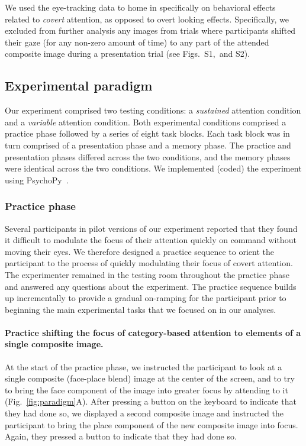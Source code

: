 \documentclass[english]{article}
\newcommand{\gazeLocations}{S1}
\newcommand{\excludedTrials}{S2}
\begin{document}
We used the eye-tracking data to home in specifically on behavioral effects
related to \textit{covert} attention, as opposed to overt looking effects.
Specifically, we excluded from further analysis any images from trials where
participants shifted their gaze (for any non-zero amount of time) to any part
of the attended composite image during a presentation trial
(see Figs.~\gazeLocations,~and \excludedTrials).

\subsection*{Experimental paradigm}

Our experiment comprised two testing conditions: a \textit{sustained} attention
condition and a \textit{variable} attention condition. Both experimental
conditions comprised a practice phase followed by a series of eight task
blocks. Each task block was in turn comprised of a presentation phase and a
memory phase. The practice and presentation phases differed across the two
conditions, and the memory phases were identical across the two conditions.
We implemented (coded) the experiment using PsychoPy~\citep{PeirEtal19}.

\subsubsection*{Practice phase}

Several participants in pilot versions of our experiment reported that they
found it difficult to modulate the focus of their attention quickly on command
without moving their eyes. We therefore designed a practice sequence to orient
the participant to the process of quickly modulating their focus of covert
attention. The experimenter remained in the testing room throughout the
practice phase and answered any questions about the experiment. The practice
sequence builds up incrementally to provide a gradual on-ramping for the
participant prior to beginning the main experimental tasks that we focused on
in our analyses.

\paragraph{Practice shifting the focus of category-based attention to elements
of a single composite image.}

At the start of the practice phase, we instructed the participant to look at a
single composite (face-place blend) image at the center of the screen, and to
try to bring the face component of the image into greater focus by attending to
it (Fig.~\ref{fig:paradigm}A). After pressing a button on the keyboard to
indicate that they had done so, we displayed a second composite image and
instructed the participant to bring the place component of the new composite
image into focus. Again, they pressed a button to indicate that they had done
so.
\end{document}

